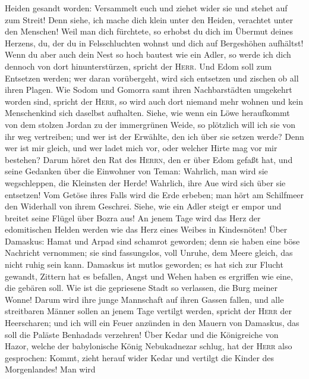 Heiden gesandt worden: Versammelt euch und ziehet wider sie und stehet
auf zum Streit!  Denn siehe, ich mache dich klein unter
den Heiden, verachtet unter den Menschen!  Weil man dich
fürchtete, so erhobst du dich im Übermut deines Herzens, du, der du in
Felsschluchten wohnst und dich auf Bergeshöhen aufhältst! Wenn du aber
auch dein Nest so hoch bautest wie ein Adler, so werde ich dich dennoch
von dort hinunterstürzen, spricht der \textsc{Herr}.  Und
Edom soll zum Entsetzen werden; wer daran vorübergeht, wird sich
entsetzen und zischen ob all ihren Plagen.  Wie Sodom und
Gomorra samt ihren Nachbarstädten umgekehrt worden sind, spricht der
\textsc{Herr}, so wird auch dort niemand mehr wohnen und kein
Menschenkind sich daselbst aufhalten.  Siehe, wie wenn
ein Löwe heraufkommt von dem stolzen Jordan zu der immergrünen Weide, so
plötzlich will ich sie von ihr weg vertreiben; und wer ist der Erwählte,
den ich über sie setzen werde? Denn wer ist mir gleich, und wer ladet
mich vor, oder welcher Hirte mag vor mir bestehen?  Darum
höret den Rat des \textsc{Herrn}, den er über Edom gefaßt hat, und seine
Gedanken über die Einwohner von Teman: Wahrlich, man wird sie
wegschleppen, die Kleinsten der Herde! Wahrlich, ihre Aue wird sich über
sie entsetzen!  Vom Getöse ihres Falls wird die Erde
erbeben; man hört am Schilfmeer den Widerhall von ihrem Geschrei.
 Siehe, wie ein Adler steigt er empor und breitet seine
Flügel über Bozra aus! An jenem Tage wird das Herz der edomitischen
Helden werden wie das Herz eines Weibes in Kindesnöten! 
Über Damaskus: Hamat und Arpad sind schamrot geworden; denn sie haben
eine böse Nachricht vernommen; sie sind fassungslos, voll Unruhe, dem
Meere gleich, das nicht ruhig sein kann.  Damaskus ist
mutlos geworden; es hat sich zur Flucht gewandt, Zittern hat es
befallen, Angst und Wehen haben es ergriffen wie eine, die gebären soll.
 Wie ist die gepriesene Stadt so verlassen, die Burg
meiner Wonne!  Darum wird ihre junge Mannschaft auf ihren
Gassen fallen, und alle streitbaren Männer sollen an jenem Tage vertilgt
werden, spricht der \textsc{Herr} der Heerscharen;  und
ich will ein Feuer anzünden in den Mauern von Damaskus, das soll die
Paläste Benhadads verzehren!  Über Kedar und die
Königreiche von Hazor, welche der babylonische König Nebukadnezar
schlug, hat der \textsc{Herr} also gesprochen: Kommt, zieht herauf wider
Kedar und vertilgt die Kinder des Morgenlandes!  Man wird
